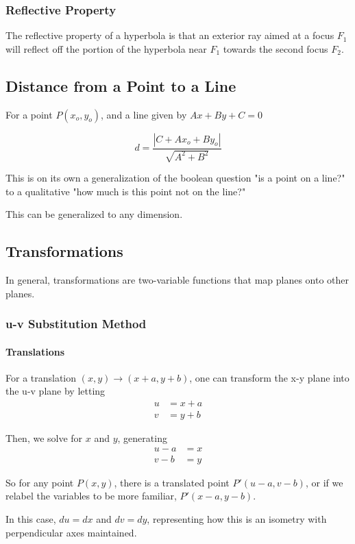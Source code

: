 \documentclass{article}
\begin{document}
\subsubsection{Reflective Property}
The reflective property of a hyperbola is that an exterior ray aimed at a focus $F_1$ will reflect off the portion of the hyperbola near $F_1$ towards the second focus $F_2$.

\subsection{Distance from a Point to a Line}
For a point $P(x_o, y_o)$, and a line given by $Ax + By + C = 0$

$$d = \frac{|C + Ax_o + By_o|}{\sqrt{A^2+B^2}}$$

This is on its own a generalization of the boolean question "is a point on a line?" to a qualitative "how much is this point not on the line?"

This can be generalized to any dimension.

\subsection{Transformations}
In general, transformations are two-variable functions that map planes onto other planes.

\subsubsection{u-v Substitution Method}
\paragraph{Translations}
For a translation $(x, y) \longrightarrow (x + a, y + b)$, one can transform the x-y plane into the u-v plane by letting
\begin{align*}
    u & = x + a  \\
    v & = y + b
\end{align*}

Then, we solve for $x$ and $y$, generating
\begin{align*}
    u - a & = x  \\
    v - b & = y
\end{align*}

So for any point $P(x,y)$, there is a translated point $P'(u-a,v-b)$, or if we relabel the variables to be more familiar, $P'(x-a,y-b)$.

In this case, $du = dx$ and $dv = dy$, representing how this is an isometry with perpendicular axes maintained.
\end{document}
